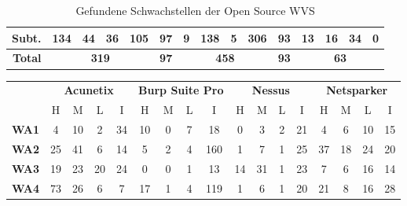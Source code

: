 \documentclass[12pt,oneside,a4paper,parskip]{scrbook}
\begin{document}
\begin{table}[H]
\begin{tabular}{|r|c|c|c|c|c|c|c|c|c|c|c|c|c|c|}
        \hline
        \textbf{Subt.}           & 134  & 44   & 36  & 105               & 97             & 9    & 138  & 5   & 306               & 93              & 13   & 16   & 34  & 0                           \\
        \hline
        \textbf{Total}              & \multicolumn{4}{c|}{\textbf{319}}     & \textbf{97}    & \multicolumn{4}{c|}{\textbf{458}}     & \textbf{93}     & \multicolumn{4}{c|}{\textbf{63}}                \\
        \hline
      \end{tabular}
      \caption[Gefundene Schwachstellen der Open Source WVS]{Gefundene Schwachstellen der Open Source WVS}
    \end{table}

    \begin{table}[H]
      \centering
      \begin{tabular}{|r|c|c|c|c|c|c|c|c|c|c|c|c|c|c|c|c|}
        \cline{2-17}
        \multicolumn{1}{l|}{}    & \multicolumn{4}{c|}{\textbf{Acunetix}}                   & \multicolumn{4}{c|}{\textbf{Burp Suite Pro}}          & \multicolumn{4}{c|}{\textbf{Nessus}}                  & \multicolumn{4}{c|}{\textbf{Netsparker}}                 \\
        \cline{2-17}
        \multicolumn{1}{c|}{}    & H            & M            & L           & I            & H           & M          & L           & I            & H           & M           & L          & I            & H            & M           & L           & I             \\
        \hline
        \textbf{WA1}   & 4            & 10           & 2           & 34           & 10          & 0          & 7           & 18           & 0           & 3           & 2          & 21           & 4            & 6           & 10          & 15            \\
        \hline
        \textbf{WA2}     & 25           & 41           & 6           & 14           & 5           & 2          & 4           & 160          & 1           & 7           & 1          & 25           & 37           & 18          & 24          & 20            \\
        \hline
        \textbf{WA3}       & 19           & 23           & 20          & 24           & 0           & 0          & 1           & 13           & 14          & 31          & 1          & 23           & 7            & 6           & 16          & 14            \\
        \hline
        \textbf{WA4} & 73           & 26           & 6           & 7            & 17          & 1          & 4           & 119          & 1           & 6           & 1          & 20           & 21           & 8           & 16          & 28            \\

\end{tabular}
\end{table}
\end{document}
